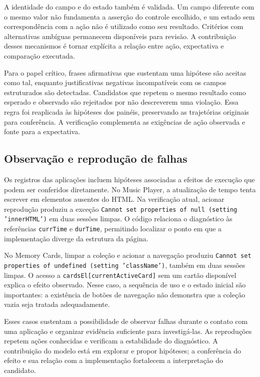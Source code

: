 \documentclass[12pt]{article}
\begin{document}
A identidade do campo e do estado também é validada. Um campo diferente com o mesmo valor não fundamenta a asserção do controle escolhido, e um estado sem correspondência com a ação não é utilizado como seu resultado. Critérios com alternativas ambíguas permanecem disponíveis para revisão. A contribuição desses mecanismos é tornar explícita a relação entre ação, expectativa e comparação executada.

Para o papel crítico, frases afirmativas que sustentam uma hipótese são aceitas como tal, enquanto justificativas negativas incompatíveis com os campos estruturados são detectadas. Candidatos que repetem o mesmo resultado como esperado e observado são rejeitados por não descreverem uma violação. Essa regra foi reaplicada às hipóteses dos painéis, preservando as trajetórias originais para conferência. A verificação complementa as exigências de ação observada e fonte para a expectativa.

\subsection{Observação e reprodução de falhas}
Os registros das aplicações incluem hipóteses associadas a efeitos de execução que podem ser conferidos diretamente. No Music Player, a atualização de tempo tenta escrever em elementos ausentes do HTML. Na verificação atual, acionar reprodução produziu a exceção \texttt{Cannot set properties of null (setting 'innerHTML')} em duas sessões limpas. O código relaciona o diagnóstico às referências \texttt{currTime} e \texttt{durTime}, permitindo localizar o ponto em que a implementação diverge da estrutura da página.

No Memory Cards, limpar a coleção e acionar a navegação produziu \texttt{Cannot set properties of undefined (setting 'className')}, também em duas sessões limpas. O acesso a \texttt{cardsEl[currentActiveCard]} sem um cartão disponível explica o efeito observado. Nesse caso, a sequência de uso e o estado inicial são importantes: a existência de botões de navegação não demonstra que a coleção vazia seja tratada adequadamente.

Esses casos sustentam a possibilidade de observar falhas durante o contato com uma aplicação e organizar evidência suficiente para investigá-las. As reproduções repetem ações conhecidas e verificam a estabilidade do diagnóstico. A contribuição do modelo está em explorar e propor hipóteses; a conferência do efeito e sua relação com a implementação fortalecem a interpretação do candidato.
\end{document}
